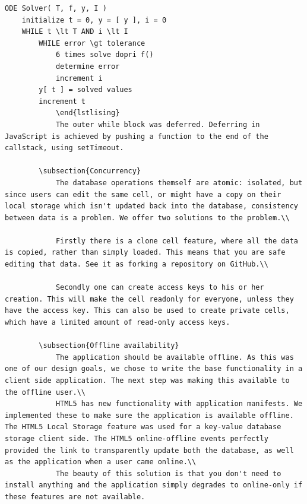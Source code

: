 \documentclass[10pt,a4paper]{report}
\begin{document}
			\begin{lstlisting}
ODE Solver( T, f, y, I )
	initialize t = 0, y = [ y ], i = 0
	WHILE t \lt T AND i \lt I
		WHILE error \gt tolerance
			6 times solve dopri f()
			determine error
			increment i
		y[ t ] = solved values
		increment t
			\end{lstlising}
			The outer while block was deferred. Deferring in JavaScript is achieved by pushing a function to the end of the callstack, using setTimeout.
		
		\subsection{Concurrency}
			The database operations themself are atomic: isolated, but since users can edit the same cell, or might have a copy on their local storage which isn't updated back into the database, consistency between data is a problem. We offer two solutions to the problem.\\ 
			
			Firstly there is a clone cell feature, where all the data is copied, rather than simply loaded. This means that you are safe editing that data. See it as forking a repository on GitHub.\\
			
			Secondly one can create access keys to his or her creation. This will make the cell readonly for everyone, unless they have the access key. This can also be used to create private cells, which have a limited amount of read-only access keys.
		
		\subsection{Offline availability}
			The application should be available offline. As this was one of our design goals, we chose to write the base functionality in a client side application. The next step was making this available to the offline user.\\
			HTML5 has new functionality with application manifests. We implemented these to make sure the application is available offline. The HTML5 Local Storage feature was used for a key-value database storage client side. The HTML5 online-offline events perfectly provided the link to transparently update both the database, as well as the application when a user came online.\\
			The beauty of this solution is that you don't need to install anything and the application simply degrades to online-only if these features are not available.
		

\end{lstlisting}
\end{document}
